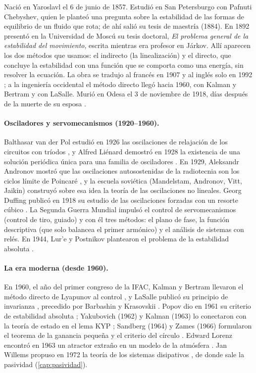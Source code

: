 \begin{historia}
Nació en Yaroslavl el 6 de junio de 1857. Estudió en San Petersburgo con Pafnuti Chebyshev, quien le planteó una pregunta sobre la estabilidad de las formas de equilibrio de un fluido que rota; de ahí salió su tesis de maestría (1884). En 1892 presentó en la Universidad de Moscú su tesis doctoral, \emph{El problema general de la estabilidad del movimiento}, escrita mientras era profesor en Járkov. Allí aparecen los dos métodos que usamos: el indirecto (la linealización) y el directo, que concluye la estabilidad con una función que se comporta como una energía, sin resolver la ecuación. La obra se tradujo al francés en 1907 y al inglés solo en 1992 \citep{Lya92}; a la ingeniería occidental el método directo llegó hacia 1960, con Kalman y Bertram y con LaSalle. Murió en Odesa el 3 de noviembre de 1918, días después de la muerte de su esposa \citep{MBM07}.
\end{historia}

\paragraph{Osciladores y servomecanismos (1920--1960).} Balthasar van der Pol estudió en 1926 las oscilaciones de relajación de los circuitos con tríodos \citep{van26}, y Alfred Liénard demostró en 1928 la existencia de una solución periódica única para una familia de osciladores \citep{Lie28}. En 1929, Aleksandr Andronov mostró que las oscilaciones autosostenidas de la radiotecnia son los ciclos límite de Poincaré \citep{And29}, y la escuela soviética (Mandelstam, Andronov, Vitt, Jaikin) construyó sobre esa idea la teoría de las oscilaciones no lineales. Georg Duffing publicó en 1918 su estudio de las oscilaciones forzadas con un resorte cúbico \citep{Duf18}. La Segunda Guerra Mundial impulsó el control de servomecanismos (control de tiro, guiado) y con él tres métodos: el plano de fase, la función descriptiva (que solo balancea el primer armónico) y el análisis de sistemas con relés. En 1944, Lur'e y Postnikov plantearon el problema de la estabilidad absoluta \citep{LuPo44}.

\paragraph{La era moderna (desde 1960).} En 1960, el año del primer congreso de la IFAC, Kalman y Bertram llevaron el método directo de Lyapunov al control \citep{KaBe60}, y LaSalle publicó su principio de invarianza \citep{LaS60}, precedido por Barbashin y Krasovskii \citep{BaKr52}. Popov dio en 1961 su criterio de estabilidad absoluta \citep{Pop61}; Yakubovich (1962) y Kalman (1963) lo conectaron con la teoría de estado en el lema KYP \citep{Yak62,Kal63}; Sandberg (1964) y Zames (1966) formularon el teorema de la ganancia pequeña y el criterio del círculo \citep{San64,Zam66a}. Edward Lorenz encontró en 1963 un atractor extraño en un modelo de la atmósfera \citep{Lor63}. Jan Willems propuso en 1972 la teoría de los sistemas disipativos \citep{Wil72}, de donde sale la pasividad (\cref{cap:pasividad}).

